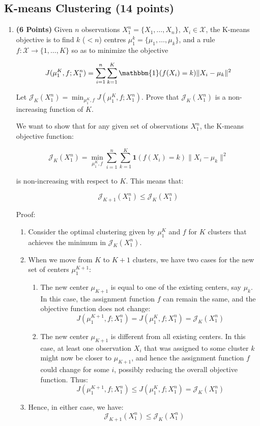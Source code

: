 \documentclass[a4paper]{article}
\newcommand{\Xcal}{\mathcal{X}}
\newcommand{\Jcal}{\mathcal{J}}
\newcommand{\indfone}{\mathbbm{1}}
\theoremstyle{definition}
\newenvironment{soln}{
    \leavevmode\color{blue}\ignorespaces
}{}
\begin{document}
\subsection{K-means Clustering (14 points)}
\begin{enumerate}

\item \textbf{(6 Points)}
Given $n$ observations $X_1^n = \{X_1, \dots, X_n\}$, $X_i \in \Xcal$, the K-means objective
is to find $k$
($<n$) centres $\mu_1^k = \{\mu_1, \dots, \mu_k\}$, and a rule $f:\Xcal \rightarrow
\{1,\dots, K\}$ so as to minimize the objective

\begin{equation}
J(\mu_1^K, f; X_1^n) = \sum_{i=1}^n \sum_{k=1}^K \indfone(f(X_i) = k) \|X_i - \mu_k\|^2
\label{eqn:kmeans}
\end{equation}

Let $\Jcal_K(X_1^n) = \min_{\mu_1^K, f} J(\mu_1^K, f; X_1^n)$. Prove that
$\Jcal_{K}(X_1^n)$ is a non-increasing function of $K$.\\

\begin{soln}
We want to show that for any given set of observations \(X_1^n\), the K-means objective function:

\[
\Jcal_{K}(X_1^n) = \min_{\mu_1^K, f} \sum_{i=1}^n \sum_{k=1}^K \mathbf{1}(f(X_i) = k) \|X_i - \mu_k\|^2
\]

is non-increasing with respect to \(K\). This means that:

\[
\Jcal_{K+1}(X_1^n) \leq \Jcal_{K}(X_1^n)
\]

Proof:

\begin{enumerate}
    \item Consider the optimal clustering given by \(\mu_1^K\) and \(f\) for \(K\) clusters that achieves the minimum in \(\Jcal_{K}(X_1^n)\).
    \item When we move from \(K\) to \(K+1\) clusters, we have two cases for the new set of centers \(\mu_1^{K+1}\):
    \begin{enumerate}
        \item The new center \(\mu_{K+1}\) is equal to one of the existing centers, say \(\mu_k\). In this case, the assignment function \(f\) can remain the same, and the objective function does not change:
        \[
        J(\mu_1^{K+1}, f; X_1^n) = J(\mu_1^K, f; X_1^n) = \Jcal_{K}(X_1^n)
        \]
        \item The new center \(\mu_{K+1}\) is different from all existing centers. In this case, at least one observation \(X_i\) that was assigned to some cluster \(k\) might now be closer to \(\mu_{K+1}\), and hence the assignment function \(f\) could change for some \(i\), possibly reducing the overall objective function. Thus:
        \[
        J(\mu_1^{K+1}, f; X_1^n) \leq J(\mu_1^K, f; X_1^n) = \Jcal_{K}(X_1^n)
        \]
    \end{enumerate}
    \item Hence, in either case, we have:
    \[
    \Jcal_{K+1}(X_1^n) \leq \Jcal_{K}(X_1^n)
    \]
\end{enumerate}


\end{soln}
\end{enumerate}
\end{document}
